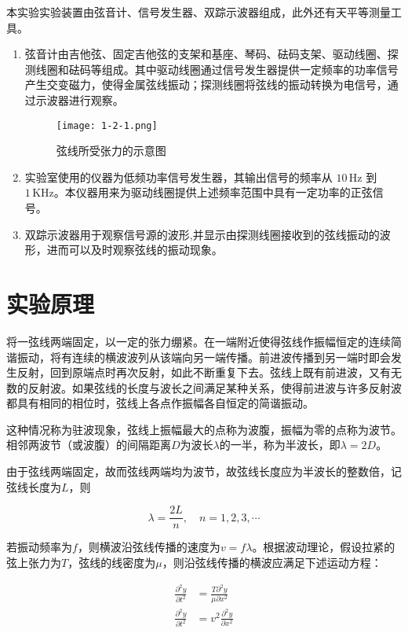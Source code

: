 \documentclass[12pt]{article}
\begin{document}
本实验实验装置由弦音计、信号发生器、双踪示波器组成，此外还有天平等测量工具。

\begin{enumerate}
    \item 弦音计由吉他弦、固定吉他弦的支架和基座、琴码、砝码支架、驱动线圈、探测线圈和砝码等组成。其中驱动线圈通过信号发生器提供一定频率的功率信号产生交变磁力，使得金属弦线振动；探测线圈将弦线的振动转换为电信号，通过示波器进行观察。
    \begin{figure}[htbp]
        \centering
        \texttt{[image: 1-2-1.png]}
        \caption{弦线所受张力的示意图}
    \end{figure}
    \item 实验室使用的仪器为低频功率信号发生器，其输出信号的频率从 $10\,\mathrm{Hz}$ 到 $1\,\mathrm{KHz}$。本仪器用来为驱动线圈提供上述频率范围中具有一定功率的正弦信号。
    \item 双踪示波器用于观察信号源的波形,并显示由探测线圈接收到的弦线振动的波形，进而可以及时观察弦线的振动现象。
\end{enumerate}

\section{实验原理}

将一弦线两端固定，以一定的张力绷紧。在一端附近使得弦线作振幅恒定的连续简谐振动，将有连续的横波波列从该端向另一端传播。前进波传播到另一端时即会发生反射，回到原端点时再次反射，如此不断重复下去。弦线上既有前进波，又有无数的反射波。如果弦线的长度与波长之间满足某种关系，使得前进波与许多反射波都具有相同的相位时，弦线上各点作振幅各自恒定的简谐振动。

这种情况称为驻波现象，弦线上振幅最大的点称为波腹，振幅为零的点称为波节。相邻两波节（或波腹）的间隔距离$D$为波长$\lambda$的一半，称为半波长，即$\lambda=2D$。

由于弦线两端固定，故而弦线两端均为波节，故弦线长度应为半波长的整数倍，记弦线长度为$ L $，则

\begin{equation}\label{eq:1}
    \lambda=\frac{2L}{n},\quad n=1,2,3,\cdots
\end{equation}

若振动频率为$f$，则横波沿弦线传播的速度为$v=f\lambda$。根据波动理论，假设拉紧的弦上张力为$ T $，弦线的线密度为$ \mu $，则沿弦线传播的横波应满足下述运动方程：

\begin{equation}\label{eq:2}
    \begin{aligned}
        \frac{\partial^2y}{\partial t^2}&=\frac{T\partial^2y}{\mu\partial x^2}\\
        \frac{\partial^2y}{\partial t^2}&=v^2\frac{\partial^2y}{\partial x^2}
    \end{aligned}
\end{equation}
\end{document}
